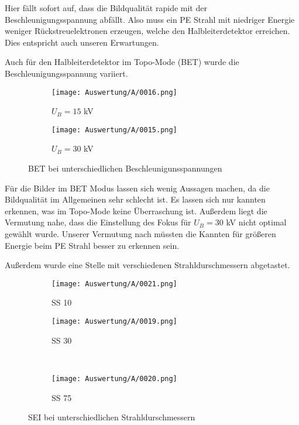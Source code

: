 Hier fällt sofort auf, dass die Bildqualität rapide mit der Beschleunigungsspannung abfällt. Also muss ein PE Strahl mit niedriger Energie weniger Rückstreuelektronen erzeugen, welche den Halbleiterdetektor erreichen. Dies entspricht auch unseren Erwartungen.

\newpage
Auch für den Halbleiterdetektor im Topo-Mode (BET) wurde die Beschleunigungsspannung variiert.
\begin{figure}[h]
    \centering
    
    \begin{subfigure}[b]{0.45\textwidth}
        \centering
        \texttt{[image: Auswertung/A/0016.png]}
        \caption{$U_B = 15$ kV}
    \end{subfigure}
    \hfill
    \begin{subfigure}[b]{0.45\textwidth}
        \centering
        \texttt{[image: Auswertung/A/0015.png]}
        \caption{$U_B = 30$ kV}
    \end{subfigure}
    
    \caption{BET bei unterschiedlichen Beschleunigunsspannungen}
\end{figure}

Für die Bilder im BET Modus lassen sich wenig Aussagen machen, da die Bildqualität im Allgemeinen sehr schlecht ist. Es lassen sich nur kannten erkennen, was im Topo-Mode keine Überraschung ist. Außerdem liegt die Vermutung nahe, dass die Einstellung des Fokus für $U_B = 30$ kV nicht optimal gewählt wurde. Unserer Vermutung nach müssten die Kannten für größeren Energie beim PE Strahl besser zu erkennen sein.

\newpage
Außerdem wurde eine Stelle mit verschiedenen Strahldurschmessern abgetastet.
\begin{figure}[h]
    \centering
    
    \begin{subfigure}[b]{0.45\textwidth}
        \centering
        \texttt{[image: Auswertung/A/0021.png]}
        \caption{SS 10}
    \end{subfigure}
    \hfill
    \begin{subfigure}[b]{0.45\textwidth}
        \centering
        \texttt{[image: Auswertung/A/0019.png]}
        \caption{SS 30}
    \end{subfigure}
    \\
    \begin{subfigure}[b]{0.45\textwidth}
        \centering
        \texttt{[image: Auswertung/A/0020.png]}
        \caption{SS 75}
    \end{subfigure}
    \caption{SEI bei unterschiedlichen Strahldurschmessern}
\end{figure}

